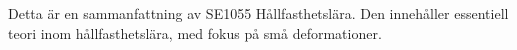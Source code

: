 Detta är en sammanfattning av SE1055 Hållfasthetslära. Den innehåller essentiell teori inom hållfasthetslära, med fokus på små deformationer.